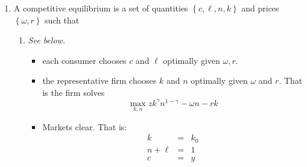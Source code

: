 \documentclass[12pt]{article}
\begin{document}
\begin{enumerate}
\begin{enumerate}
\item In the special case these are%
\begin{equation*}
\left( 1-\alpha \right) n_{1}^{-1}=\left( 1-n_{1}-n_{2}\right) ^{-1}
\end{equation*}%
\begin{equation*}
\left( 1-\alpha \right) n_{2}^{-1}=\left( 1-n_{1}-n_{2}\right) ^{-1}
\end{equation*}%
\begin{equation*}
k_{1}^{-1}=\left( k_{s}-k_{1}\right) ^{-1}
\end{equation*}%
From the first two%
\begin{equation*}
n_{1}=n_{2}
\end{equation*}%
so that the first gives 
\begin{equation*}
\left( 1-\alpha \right) \left( 1-2n_{2}\right) =n_{2}
\end{equation*}%
Thus%
\begin{eqnarray*}
n_{2} &=&\frac{1-\alpha }{3-2\alpha } \\
n_{1} &=&\frac{1-\alpha }{3-2\alpha } \\
\ell &=&\frac{1}{3-2\alpha }
\end{eqnarray*}%
From $k_{1}^{-1}=\left( k_{s}-k_{1}\right) ^{-1},$ clearly $k_{1}=\frac{k_{s}%
}{2}.$
\end{enumerate}

\item A competitive equilibrium is a set of quantities $\left\{ c,\ell
,n,k\right\} $ and prices $\left\{ \omega ,r\right\} $ such that

\begin{enumerate}
\item \textit{See below.}
\begin{itemize}
\item each consumer chooses $c$ and $\ell $ optimally given $\omega ,r$.

\item the representative firm chooses $k$ and $n$ optimally given $\omega $
and $r.$ That is the firm solves%
\begin{equation*}
\underset{k,n}{\max }zk^{\gamma }n^{1-\gamma }-\omega n-rk
\end{equation*}

\item Markets clear. That is:%
\begin{eqnarray*}
k &=&k_{0} \\
n+\ell &=&1 \\
c &=&y
\end{eqnarray*}
\end{itemize}


\end{enumerate}
\end{enumerate}
\end{document}
